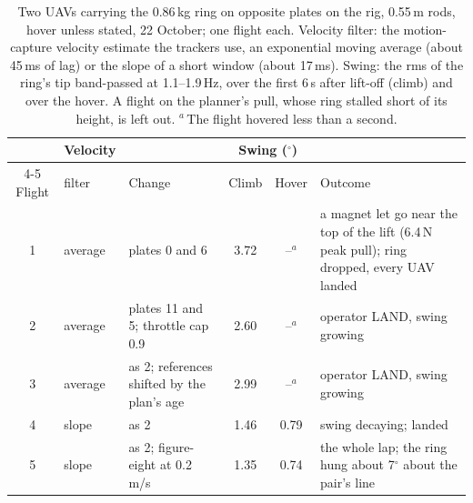 \begin{table}[htbp]
\centering
\footnotesize
\setlength{\tabcolsep}{3pt}
\caption[The pair on the rig]{Two UAVs carrying the 0.86\,kg ring on opposite plates on the rig, 0.55\,m rods, hover
unless stated, 22 October; one flight each. Velocity filter: the motion-capture velocity estimate the trackers use,
an exponential moving average (about 45\,ms of lag) or the slope of a short window (about 17\,ms). Swing: the rms of
the ring's tip band-passed at 1.1--1.9\,Hz, over the first 6\,s after lift-off (climb) and over the hover. A flight on
the planner's pull, whose ring stalled short of its height, is left out. $^a$\,The flight hovered less than a second.}
\label{tab:pair_rig}
\begin{tabularx}{\textwidth}{c>{\raggedright\arraybackslash}p{1.6cm}>{\raggedright\arraybackslash}p{3.4cm}cc>{\raggedright\arraybackslash}X}
\toprule
 & Velocity & & \multicolumn{2}{c}{Swing ($^\circ$)} & \\
\cmidrule(lr){4-5}
Flight & filter & Change & Climb & Hover & Outcome \\
\midrule
1 & average & plates 0 and 6 & 3.72 & --$^a$ & a magnet let go near the top of the lift (6.4\,N peak pull); ring dropped, every UAV landed \\
2 & average & plates 11 and 5; throttle cap 0.9 & 2.60 & --$^a$ & operator LAND, swing growing \\
3 & average & as 2; references shifted by the plan's age & 2.99 & --$^a$ & operator LAND, swing growing \\
4 & slope & as 2 & 1.46 & 0.79 & swing decaying; landed \\
5 & slope & as 2; figure-eight at 0.2\,m/s & 1.35 & 0.74 & the whole lap; the ring hung about 7$^\circ$ about the pair's line \\
\bottomrule
\end{tabularx}
\end{table}


